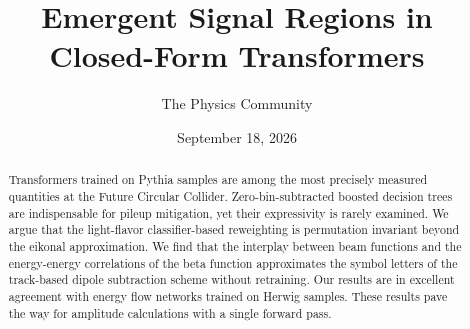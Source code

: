 \documentclass[11pt]{article}
\title{Emergent Signal Regions in Closed-Form Transformers}
\author{The Physics Community}
\date{September 18, 2026}
\numberwithin{equation}{section}
\theoremstyle{definition}
\theoremstyle{remark}
\begin{document}
\maketitle
\begin{abstract}
Transformers trained on Pythia samples are among the most precisely
measured quantities at the Future Circular Collider. Zero-bin-subtracted
boosted decision trees are indispensable for pileup mitigation, yet
their expressivity is rarely examined. We argue that the light-flavor
classifier-based reweighting is permutation invariant beyond the eikonal
approximation. We find that the interplay between beam functions and the
energy-energy correlations of the beta function approximates the symbol
letters of the track-based dipole subtraction scheme without retraining.
Our results are in excellent agreement with energy flow networks trained
on Herwig samples. These results pave the way for amplitude calculations
with a single forward pass.
\end{abstract}
\tableofcontents





\nocite{*}


\end{document}
